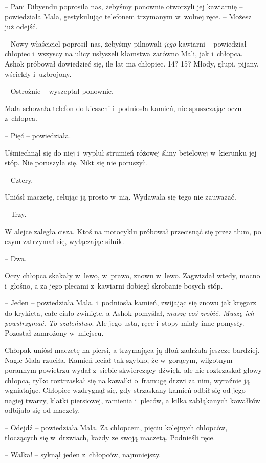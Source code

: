\documentclass[oneside,polish,11pt,rmheadings]{mwbk}
\begin{document}
-- Pani Dibyendu poprosiła nas, żebyśmy ponownie otworzyli jej kawiarnię -- powiedziała Mala, gestykulując telefonem trzymanym w~wolnej ręce. -- Możesz już odejść. 

-- Nowy właściciel poprosił nas, żebyśmy pilnowali \textit{jego }kawiarni -- powiedział chłopiec i~wszyscy na ulicy usłyszeli kłamstwa zarówno Mali, jak i~chłopca. Ashok próbował dowiedzieć się, ile lat ma chłopiec. 14? 15? Młody, głupi, pijany, wściekły i~uzbrojony.

-- Ostrożnie -- wyszeptał ponownie.

Mala schowała telefon do kieszeni i~podniosła kamień, nie spuszczając oczu z~chłopca.

-- Pięć -- powiedziała.

Uśmiechnął się do niej i~wypluł strumień różowej śliny betelowej w~kierunku jej stóp. Nie poruszyła się. Nikt się nie poruszył.

-- Cztery.

Uniósł maczetę, celując ją prosto w~nią. Wydawała się tego nie zauważać.

-- Trzy. 

W alejce zaległa cisza. Ktoś na motocyklu próbował przecisnąć się przez tłum, po czym zatrzymał się, wyłączając silnik.

-- Dwa. 

Oczy chłopca skakały w~lewo, w~prawo, znowu w~lewo. Zagwizdał wtedy, mocno i~głośno, a za jego plecami z~kawiarni dobiegł skrobanie bosych stóp.

-- Jeden -- powiedziała Mala. i~podniosła kamień, zwijając się znowu jak kręgarz do krykieta, całe ciało zwinięte, a Ashok pomyślał, \textit{muszę coś zrobić. Muszę ich powstrzymać. To szaleństwo}. Ale jego usta, ręce i~stopy miały inne pomysły. Pozostał zamrożony w~miejscu.

Chłopak uniósł maczetę na piersi, a trzymająca ją dłoń zadrżała jeszcze bardziej. Nagle Mala rzuciła. Kamień leciał tak szybko, że w~gorącym, wilgotnym porannym powietrzu wydał z~siebie skwierczący dźwięk, ale nie roztrzaskał głowy chłopca, tylko roztrzaskał się na kawałki o~framugę drzwi za nim, wyraźnie ją wgniatając. Chłopiec wzdrygnął się, gdy strzaskany kamień odbił się od jego nagiej twarzy, klatki piersiowej, ramienia i~pleców, a kilka zabłąkanych kawałków odbijało się od maczety.

-- Odejdź -- powiedziała Mala. Za chłopcem, pięciu kolejnych chłopców, tłoczących się w~drzwiach, każdy ze swoją maczetą. Podnieśli ręce. 

-- Walka! -- syknął jeden z~chłopców, najmniejszy. 
\end{document}
